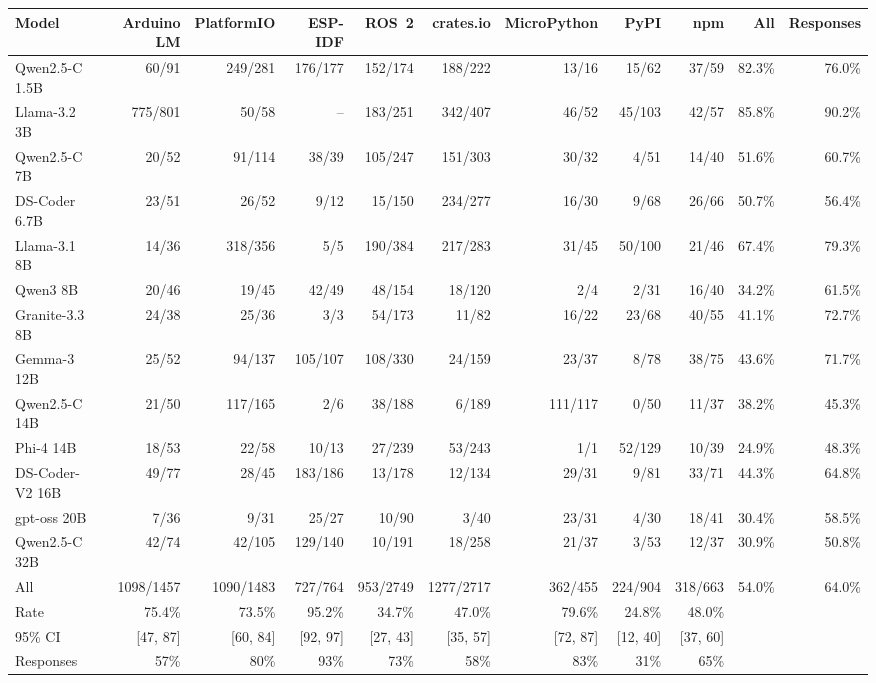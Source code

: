 \begin{tabular}{@{}lrrrrrrrrrr@{}}
\toprule
Model & Arduino LM & PlatformIO & ESP-IDF & ROS~2 & crates.io & MicroPython & PyPI & npm & All & Responses \\
\midrule
Qwen2.5-C 1.5B & 60/91 & 249/281 & 176/177 & 152/174 & 188/222 & 13/16 & 15/62 & 37/59 & 82.3\% & 76.0\% \\
Llama-3.2 3B & 775/801 & 50/58 & -- & 183/251 & 342/407 & 46/52 & 45/103 & 42/57 & 85.8\% & 90.2\% \\
Qwen2.5-C 7B & 20/52 & 91/114 & 38/39 & 105/247 & 151/303 & 30/32 & 4/51 & 14/40 & 51.6\% & 60.7\% \\
DS-Coder 6.7B & 23/51 & 26/52 & 9/12 & 15/150 & 234/277 & 16/30 & 9/68 & 26/66 & 50.7\% & 56.4\% \\
Llama-3.1 8B & 14/36 & 318/356 & 5/5 & 190/384 & 217/283 & 31/45 & 50/100 & 21/46 & 67.4\% & 79.3\% \\
Qwen3 8B & 20/46 & 19/45 & 42/49 & 48/154 & 18/120 & 2/4 & 2/31 & 16/40 & 34.2\% & 61.5\% \\
Granite-3.3 8B & 24/38 & 25/36 & 3/3 & 54/173 & 11/82 & 16/22 & 23/68 & 40/55 & 41.1\% & 72.7\% \\
Gemma-3 12B & 25/52 & 94/137 & 105/107 & 108/330 & 24/159 & 23/37 & 8/78 & 38/75 & 43.6\% & 71.7\% \\
Qwen2.5-C 14B & 21/50 & 117/165 & 2/6 & 38/188 & 6/189 & 111/117 & 0/50 & 11/37 & 38.2\% & 45.3\% \\
Phi-4 14B & 18/53 & 22/58 & 10/13 & 27/239 & 53/243 & 1/1 & 52/129 & 10/39 & 24.9\% & 48.3\% \\
DS-Coder-V2 16B & 49/77 & 28/45 & 183/186 & 13/178 & 12/134 & 29/31 & 9/81 & 33/71 & 44.3\% & 64.8\% \\
gpt-oss 20B & 7/36 & 9/31 & 25/27 & 10/90 & 3/40 & 23/31 & 4/30 & 18/41 & 30.4\% & 58.5\% \\
Qwen2.5-C 32B & 42/74 & 42/105 & 129/140 & 10/191 & 18/258 & 21/37 & 3/53 & 12/37 & 30.9\% & 50.8\% \\
\midrule
All & 1098/1457 & 1090/1483 & 727/764 & 953/2749 & 1277/2717 & 362/455 & 224/904 & 318/663 & 54.0\% & 64.0\% \\
Rate & 75.4\% & 73.5\% & 95.2\% & 34.7\% & 47.0\% & 79.6\% & 24.8\% & 48.0\% & & \\
95\% CI & [47, 87] & [60, 84] & [92, 97] & [27, 43] & [35, 57] & [72, 87] & [12, 40] & [37, 60] & & \\
Responses & 57\% & 80\% & 93\% & 73\% & 58\% & 83\% & 31\% & 65\% & & \\
\bottomrule
\end{tabular}
